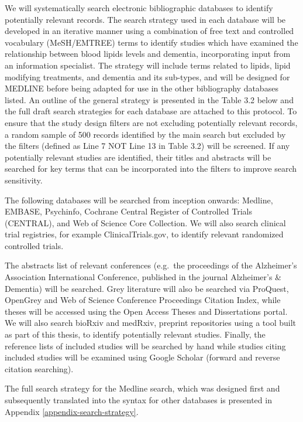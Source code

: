 \documentclass[a4paper, twoside]{templates/ociamthesis}
\begin{document}
We will systematically search electronic bibliographic databases to identify potentially relevant records. The search strategy used in each database will be developed in an iterative manner using a combination of free text and controlled vocabulary (MeSH/EMTREE) terms to identify studies which have examined the relationship between blood lipids levels and dementia, incorporating input from an information specialist. The strategy will include terms related to lipids, lipid modifying treatments, and dementia and its sub-types, and will be designed for MEDLINE before being adapted for use in the other bibliography databases listed. An outline of the general strategy is presented in the Table 3.2 below and the full draft search strategies for each database are attached to this protocol. To ensure that the study design filters are not excluding potentially relevant records, a random sample of 500 records identified by the main search but excluded by the filters (defined as Line 7 NOT Line 13 in Table 3.2) will be screened. If any potentially relevant studies are identified, their titles and abstracts will be searched for key terms that can be incorporated into the filters to improve search sensitivity.

The following databases will be searched from inception onwards: Medline, EMBASE, Psychinfo, Cochrane Central Register of Controlled Trials (CENTRAL), and Web of Science Core Collection. We will also search clinical trial registries, for example ClinicalTrials.gov, to identify relevant randomized controlled trials.

The abstracts list of relevant conferences (e.g.~the proceedings of the Alzheimer's Association International Conference, published in the journal Alzheimer's \& Dementia) will be searched. Grey literature will also be searched via ProQuest, OpenGrey and Web of Science Conference Proceedings Citation Index, while theses will be accessed using the Open Access Theses and Dissertations portal. We will also search bioRxiv and medRxiv, preprint repositories using a tool built as part of this thesis, to identify potentially relevant studies. Finally, the reference lists of included studies will be searched by hand while studies citing included studies will be examined using Google Scholar (forward and reverse citation searching).

The full search strategy for the Medline search, which was designed first and subsequently translated into the syntax for other databases is presented in Appendix \ref{appendix-search-strategy}.
\end{document}
